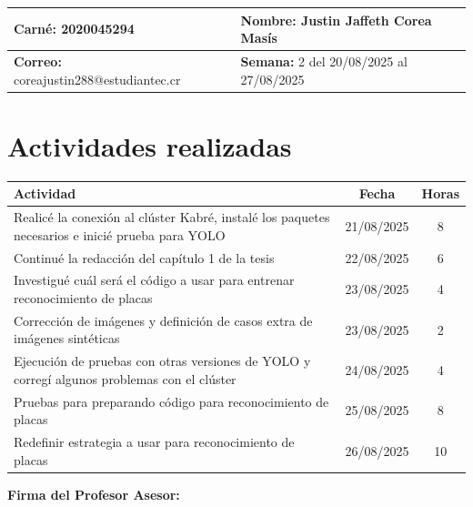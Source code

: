 \documentclass[12pt,a4paper]{article}
\begin{document}
\noindent
\begin{tabularx}{\textwidth}{|X|X|}
\hline
\textbf{Carné:} 2020045294 & \textbf{Nombre:} Justin Jaffeth Corea Masís \\
\hline
\textbf{Correo:} coreajustin288@estudiantec.cr & \textbf{Semana:} 2 del 20/08/2025 al 27/08/2025 \\
\hline
\end{tabularx}

\vspace{0.5cm}

\section*{Actividades realizadas}

\begin{tabularx}{\textwidth}{|>{\raggedright\arraybackslash}p{12cm}|c|c|}
\hline
\textbf{Actividad} & \textbf{Fecha} & \textbf{Horas} \\
\hline
Realicé la conexión al clúster Kabré, instalé los paquetes necesarios e inicié prueba para YOLO & 21/08/2025 & 8 \\
\hline
Continué la redacción del capítulo 1 de la tesis & 22/08/2025 & 6 \\
\hline
Investigué cuál será el código a usar para entrenar reconocimiento de placas & 23/08/2025 & 4 \\
\hline
Corrección de imágenes y definición de casos extra de imágenes sintéticas & 23/08/2025 & 2 \\
\hline
Ejecución de pruebas con otras versiones de YOLO y corregí algunos problemas con el clúster & 24/08/2025 & 4 \\
\hline
Pruebas para preparando código para reconocimiento de placas & 25/08/2025 & 8 \\
\hline
Redefinir estrategia a usar para reconocimiento de placas & 26/08/2025 & 10 \\
\hline
\end{tabularx}

\vspace{1cm}

\noindent
\textbf{Firma del Profesor Asesor:}
\end{document}
